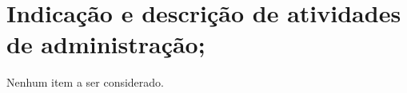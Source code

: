 \section[Indicação e descrição de atividades de administração]{Indicação e descrição de atividades de administração;}

Nenhum item a ser considerado.